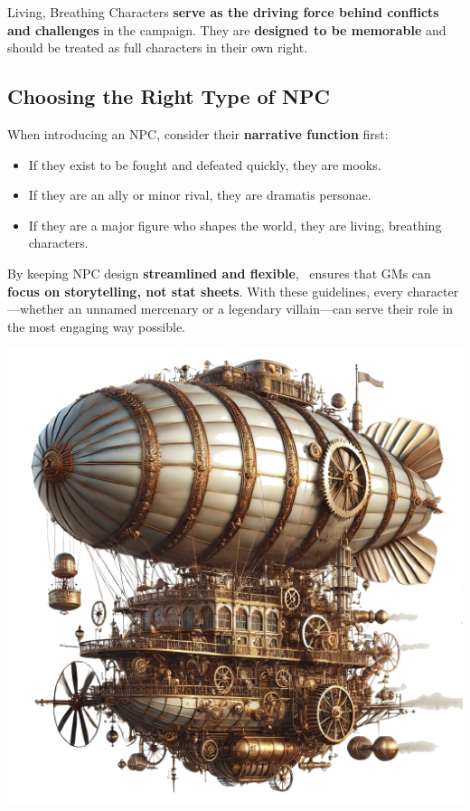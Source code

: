 Living, Breathing Characters \textbf{serve as the driving force behind conflicts and challenges} in the campaign. They are \textbf{designed to be memorable} and should be treated as full characters in their own right.

\vspace*{\fill}\newcolumn
\subsection{Choosing the Right Type of NPC}

When introducing an NPC, consider their \textbf{narrative function} first:
\begin{itemize}
    \item If they exist to be fought and defeated quickly, they are mooks.
    \item If they are an ally or minor rival, they are dramatis personae.
    \item If they are a major figure who shapes the world, they are living, breathing characters.
\end{itemize}

By keeping NPC design \textbf{streamlined and flexible}, \wyrd\ ensures that GMs can \textbf{focus on storytelling, not stat sheets}. With these guidelines, every character—whether an unnamed mercenary or a legendary villain—can serve their role in the most engaging way possible.

\vspace*{4cm}
\begin{center}
	\includegraphics[width=\linewidth]{img/pageart/steampunk_airship_cleaned}
\end{center}